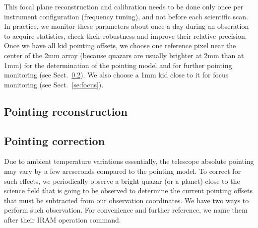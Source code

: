 
This focal plane reconstruction and calibration needs to be done only once per
instrument configuration (frequency tuning), and not before each scientific
scan. In practice, we monitor these parameters about once a day during an
obseration to acquire statistics, check their robustness and improve their
relative precision. Once we have all kid pointing offsets, we choose one
reference pixel near the center of the 2mm array (because quazars are usually
brighter at 2mm than at 1mm) for the determination of the pointing model and for
further pointing monitoring (see Sect.~\ref{se:pointing_cross}). We also choose
a 1mm kid close to it for focus monitoring (see Sect.~\ref{se:focus}).


\subsection{Pointing reconstruction}


\subsection{Pointing correction}
\label{se:pointing_cross}

Due to ambient temperature variations essentially, the telescope absolute
pointing may vary by a few arcseconds compared to the pointing model. To correct
for such effects, we periodically observe a bright quazar (or a planet) close to
the science field that is going to be observed to determine the current pointing
offsets that must be subtracted from our observation coordinates. We have two
ways to perform such observation. For convenience and further reference, we name
them after their IRAM operation command.

